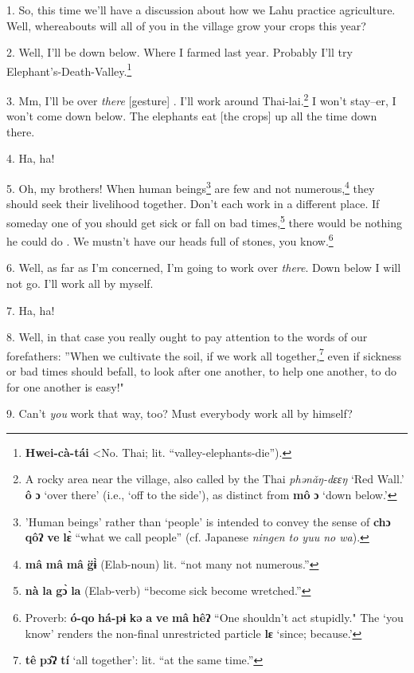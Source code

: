 \setcounter{footnote}{0}

1. So, this time we'll have a discussion about how we Lahu practice agriculture.
Well, whereabouts will all of you in the village grow your crops this year?

2. Well, I'll be down below. Where I farmed last year. Probably I'll try Elephant's-Death-Valley.\footnote{\textbf{Hwei-cà-tái} <No. Thai; lit. ``valley-elephants-die'').}

3. Mm, I'll be over \textit{there} [gesture] . I'll work around Thai-lai.\footnote{A rocky area near the village, also called by the Thai \textit{phənǎŋ-dɛɛŋ} `Red Wall.' \textbf{ô} \textbf{ɔ} `over there' (i.e., `off to the side'), as distinct from \textbf{mô} \textbf{ɔ} `down below.'}
I won't stay--er, I won't come down below. The elephants eat [the crops] up all
the time down there.

4. Ha, ha!

5. Oh, my brothers! When human beings\footnote{'Human beings' rather than `people' is intended to convey the sense of \textbf{chɔ} \textbf{qôʔ} \textbf{ve} \textbf{lɛ̀} ``what we call people'' (cf. Japanese \textit{ningen to yuu no wa}).} are few and not numerous,\footnote{\textbf{mâ} \textbf{mâ} \textbf{mâ} \textbf{g̈ɨ̀} (Elab-noun) lit. ``not many not numerous.''} they should
seek their livelihood together. Don't each work in a different place. If someday
one of you should get sick or fall on bad times,\footnote{\textbf{nà} \textbf{la} \textbf{gɔ̀} \textbf{la} (Elab-verb) ``become sick become wretched.''} there would be nothing he
could do . We mustn't have our heads full of stones, you know.\footnote{Proverb: \textbf{ó-qo} \textbf{há-pɨ} \textbf{kə} \textbf{a} \textbf{ve} \textbf{mâ} \textbf{hêʔ} ``One shouldn't act stupidly." The `you know' renders the non-final unrestricted particle \textbf{lɛ} `since; because.'}

6. Well, as far as I'm concerned, I'm going to work over \textit{there}. Down below
I will not go. I'll work all by myself.

7. Ha, ha!

8. Well, in that case you really ought to pay attention to the words of our forefathers:
''When we cultivate the soil, if we work all together,\footnote{\textbf{tê} \textbf{pɔ̂ʔ} \textbf{tí} `all together': lit. ``at the same time.''} even if sickness
or bad times should befall, to look after one another, to help one another, to
do for one another is easy!"

9. Can't \textit{you} work that way, too? Must everybody work all by himself?

